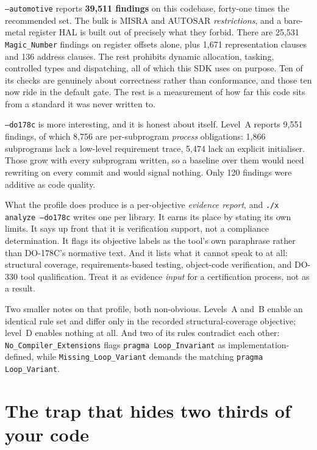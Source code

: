 \texttt{--automotive} reports \textbf{39,511 findings} on this codebase, forty-one
times the recommended set. The bulk is MISRA and AUTOSAR \emph{restrictions}, and a
bare-metal register HAL is built out of precisely what they forbid. There are 25,531
\lstinline{Magic_Number} findings on register offsets alone, plus 1,671 representation
clauses and 136 address clauses. The rest prohibits dynamic allocation, tasking,
controlled types and dispatching, all of which this SDK uses on purpose. Ten of its checks are genuinely about
correctness rather than conformance, and those ten now ride in the default gate. The
rest is a measurement of how far this code sits from a standard it was never written
to.

\texttt{--do178c} is more interesting, and it is honest about itself. Level~A reports
9,551 findings, of which 8,756 are per-subprogram \emph{process} obligations: 1,866
subprograms lack a low-level requirement trace, 5,474 lack an explicit initialiser.
Those grow with every subprogram written, so a baseline over them would need rewriting
on every commit and would signal nothing. Only 120 findings were additive as code
quality.

What the profile does produce is a per-objective \emph{evidence report}, and
\texttt{./x analyze --do178c} writes one per library. It earns its place by stating its
own limits. It says up front that it is verification support, not a compliance
determination. It flags its objective labels as the tool's own paraphrase rather than
DO-178C's normative text. And it lists what it cannot speak to at all: structural
coverage, requirements-based testing, object-code verification, and DO-330 tool
qualification. Treat it as evidence \emph{input} for a certification process, not
as a result.

Two smaller notes on that profile, both non-obvious. Levels~A and~B enable an identical
rule set and differ only in the recorded structural-coverage objective; level~D enables
nothing at all. And two of its rules contradict each other:
\lstinline{No_Compiler_Extensions} flags \lstinline{pragma Loop_Invariant} as
implementation-defined, while \lstinline{Missing_Loop_Variant} demands the matching
\lstinline{pragma Loop_Variant}.

\section{The trap that hides two thirds of your code}

